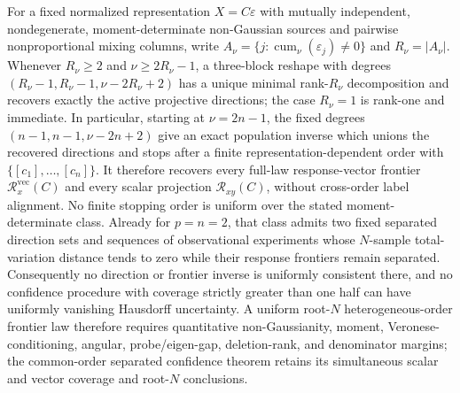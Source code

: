 For a fixed normalized representation \(X=C\varepsilon\) with mutually independent, nondegenerate, moment-determinate non-Gaussian sources and pairwise nonproportional mixing columns, write \(A_\nu=\{j:\operatorname{cum}_\nu(\varepsilon_j)\ne0\}\) and \(R_\nu=|A_\nu|\). Whenever \(R_\nu\ge2\) and \(\nu\ge2R_\nu-1\), a three-block reshape with degrees \((R_\nu-1,R_\nu-1,\nu-2R_\nu+2)\) has a unique minimal rank-\(R_\nu\) decomposition and recovers exactly the active projective directions; the case \(R_\nu=1\) is rank-one and immediate. In particular, starting at \(\nu=2n-1\), the fixed degrees \((n-1,n-1,\nu-2n+2)\) give an exact population inverse which unions the recovered directions and stops after a finite representation-dependent order with \(\{[c_1],\ldots,[c_n]\}\). It therefore recovers every full-law response-vector frontier \(\mathcal R_x^{\mathrm{vec}}(C)\) and every scalar projection \(\mathcal R_{xy}(C)\), without cross-order label alignment. No finite stopping order is uniform over the stated moment-determinate class. Already for \(p=n=2\), that class admits two fixed separated direction sets and sequences of observational experiments whose \(N\)-sample total-variation distance tends to zero while their response frontiers remain separated. Consequently no direction or frontier inverse is uniformly consistent there, and no confidence procedure with coverage strictly greater than one half can have uniformly vanishing Hausdorff uncertainty. A uniform root-\(N\) heterogeneous-order frontier law therefore requires quantitative non-Gaussianity, moment, Veronese-conditioning, angular, probe/eigen-gap, deletion-rank, and denominator margins; the common-order separated confidence theorem retains its simultaneous scalar and vector coverage and root-\(N\) conclusions.